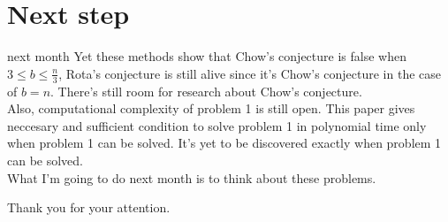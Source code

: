 \documentclass[11pt,xcolor=dvipsnames,table,dvipdfmx]{beamer}
\begin{document}
\section{Next step}
\begin{frame}{next month}
 Yet these methods show that Chow's conjecture is false when $3 \leq b \leq \frac{n}{3}$, Rota's conjecture is still alive since it's Chow's conjecture in the case of $b = n$. There's still room for research about Chow's conjecture. \\
 Also, computational complexity of problem 1 is still open. This paper gives neccesary and sufficient condition to solve problem 1 in polynomial time only when problem 1 can be solved. It's yet to be discovered exactly when problem 1 can be solved. \\
 What I'm going to do next month is to think about these problems.
\end{frame}

\begin{frame}
 \begin{center}
  Thank you for your attention.
 \end{center}
\end{frame}
\end{document}
